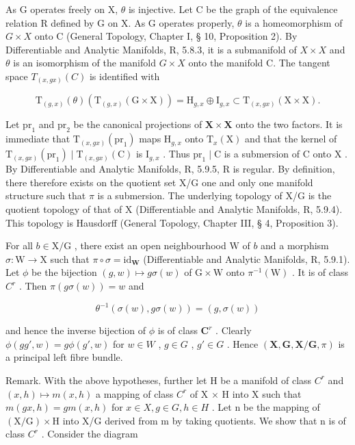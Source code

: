 As G operates freely on X, \(\theta\) is injective. Let C be the graph of the equivalence relation R defined by G on X. As G operates properly, \(\theta\) is a homeomorphism of \(G \times X\) onto C (General Topology, Chapter I, § 10, Proposition 2). By Differentiable and Analytic Manifolds, R, 5.8.3, it is a submanifold of \(X \times X\) and \(\theta\) is an isomorphism of the manifold \(G \times X\) onto the manifold C. The tangent space \(T_{(x,gx)}(C)\) is identified with

\[
\mathrm{T} _ {(g, x)} (\theta) \left(\mathrm{T} _ {(g, x)} (\mathrm{G} \times \mathrm{X})\right) = \mathrm{H} _ {g, x} \oplus \mathrm{I} _ {g, x} \subset \mathrm{T} _ {(x, g x)} (\mathrm{X} \times \mathrm{X}).
\]

Let \(\mathrm{pr}_1\) and \(\mathrm{pr}_2\) be the canonical projections of \(\mathbf{X} \times \mathbf{X}\) onto the two factors. It is immediate that \(\mathrm{T}_{(x,gx)}(\mathrm{pr}_1)\) maps \(\mathrm{H}_{g,x}\) onto \(\mathrm{T}_x(\mathrm{X})\) and that the kernel of \(\mathrm{T}_{(x,gx)}(\mathrm{pr}_1) \mid \mathrm{T}_{(x,gx)}(\mathrm{C})\) is \(\mathrm{I}_{g,x}\) . Thus \(\mathrm{pr}_1 \mid \mathrm{C}\) is a submersion of \(\mathrm{C}\) onto \(\mathrm{X}\) . By Differentiable and Analytic Manifolds, R, 5.9.5, R is regular. By definition, there therefore exists on the quotient set X/G one and only one manifold structure such that \(\pi\) is a submersion. The underlying topology of X/G is the quotient topology of that of X (Differentiable and Analytic Manifolds, R, 5.9.4). This topology is Hausdorff (General Topology, Chapter III, § 4, Proposition 3).

For all \(b \in \mathrm{X} / \mathrm{G}\) , there exist an open neighbourhood \(\mathrm{W}\) of \(b\) and a morphism \(\sigma: \mathrm{W} \to \mathrm{X}\) such that \(\pi \circ \sigma = \mathrm{id}_{\mathbf{W}}\) (Differentiable and Analytic Manifolds, R, 5.9.1). Let \(\phi\) be the bijection \((g, w) \mapsto g\sigma(w)\) of \(\mathrm{G} \times \mathrm{W}\) onto \(\pi^{-1}(\mathrm{W})\) . It is of class \(C^r\) . Then \(\pi(g\sigma(w)) = w\) and

\[
\theta^ {- 1} (\sigma (w), g \sigma (w)) = (g, \sigma (w))
\]

and hence the inverse bijection of \(\phi\) is of class \(\mathbf{C}^r\) . Clearly \(\phi(gg', w) = g\phi(g', w)\) for \(w \in W\) , \(g \in G\) , \(g' \in G\) . Hence \((\mathbf{X}, \mathbf{G}, \mathbf{X}/\mathbf{G}, \pi)\) is a principal left fibre bundle.

Remark. With the above hypotheses, further let H be a manifold of class \(C^{r}\) and \((x, h) \mapsto m(x, h)\) a mapping of class \(C^{r}\) of X × H into X such that \(m(gx, h) = gm(x, h)\) for \(x \in X, g \in G, h \in H\) . Let n be the mapping of \((\mathrm{X}/\mathrm{G}) \times \mathrm{H}\) into X/G derived from m by taking quotients. We show that n is of class \(C^{r}\) . Consider the diagram

